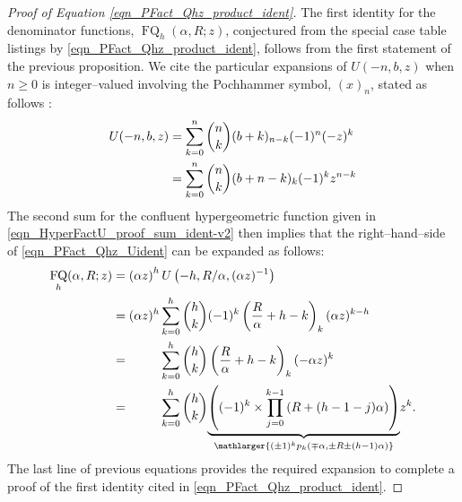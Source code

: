 \documentclass[12pt,reqno]{article}
\numberwithin{sfootnote}{section}
\numberwithin{equation}{section}
\theoremstyle{DefaultTheoremStyle}
\theoremstyle{definition}
\newcommand{\pn}[3]{\ensuremath{p_{#1}\left(#2, #3\right)}}
\newcommand{\HypU}[3]{\ensuremath{U\left(#1, #2, #3\right)}}
\DeclareMathOperator{\FQ}{FQ}
\begin{document}
\begin{proof}[Proof of Equation \eqref{eqn_PFact_Qhz_product_ident}] 
The first identity for the denominator functions, $\FQ_h(\alpha, R; z)$, 
conjectured from the special case table listings by 
\eqref{eqn_PFact_Qhz_product_ident}, follows from the 
first statement of the previous proposition. 
We cite the particular expansions of $U(-n, b, z)$ when 
$n \geq 0$ is integer--valued involving the Pochhammer symbol, $(x)_n$, 
stated as follows \citep[\S 13.2(i)]{NISTHB}: 
\begin{align} 
\notag 
U(-n, b, z) & = \sum_{k=0}^{n} \binom{n}{k} (b+k)_{n-k} (-1)^n (-z)^k \\ 
\label{eqn_HyperFactU_proof_sum_ident-v2} 
   & = 
     \sum_{k=0}^{n} \binom{n}{k} (b+n-k)_{k} (-1)^{k} z^{n-k} 
\end{align} 
The second sum for the confluent hypergeometric function given in 
\eqref{eqn_HyperFactU_proof_sum_ident-v2} 
then implies that the right--hand--side of 
\eqref{eqn_PFact_Qhz_Uident} can be expanded as follows: 
\begin{align*} 
\FQ_h(\alpha, R; z) & = 
     \left(\alpha z\right)^{h} 
     \HypU{-h}{R / \alpha}{(\alpha z)^{-1}} \\ 
   & = 
     (\alpha z)^h \sum_{k=0}^{h} \binom{h}{k} (-1)^k 
     \left(\frac{R}{\alpha} + h-k\right)_{k} (\alpha z)^{k-h} \\ 
   & = \phantom{(\alpha z)^h} 
     \sum_{k=0}^{h} \binom{h}{k} 
     \left(\frac{R}{\alpha} + h-k\right)_{k} (-\alpha z)^{k} \\ 
   & = \phantom{(\alpha z)^h} 
     \sum_{k=0}^{h} \binom{h}{k} 
     \underset{
     \mathlarger{(\pm 1)^{k} \pn{k}{\mp \alpha}{\pm R \pm (h-1) \alpha}}
     }{ 
     \underbrace{ 
     \left( 
     (-1)^{k} \times \prod_{j=0}^{k-1} \left(R+(h-1-j) \alpha \right) 
     \right) 
     } 
     } 
     z^{k}. 
\end{align*} 
The last line of previous equations 
provides the required expansion to complete a proof of the 
first identity cited in \eqref{eqn_PFact_Qhz_product_ident}. 
\end{proof} 
\end{document}

